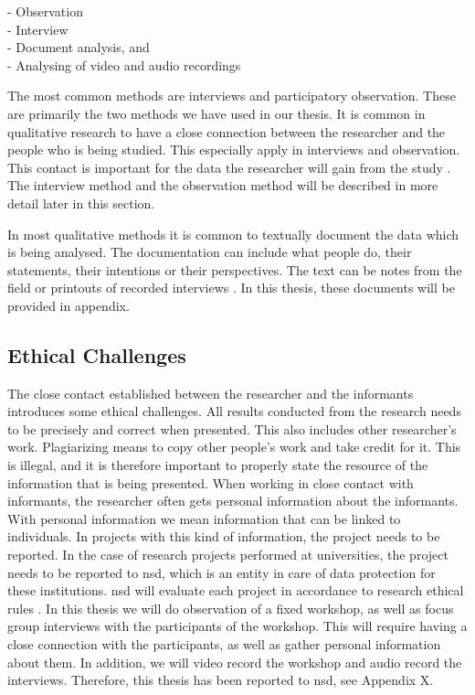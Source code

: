 - Observation \\
- Interview \\ 
- Document analysis, and \\
- Analysing of video and audio recordings

The most common methods are interviews and participatory observation. These are primarily the two methods we have used in our thesis. It is common in qualitative research to have a close connection between the researcher and the people who is being studied. This especially apply in interviews and observation. This contact is important for the data the researcher will gain from the study \cite{qualitative}. The interview method and the observation method will be described in more detail later in this section.

In most qualitative methods it is common to textually document the data which is being analysed. The documentation can include what people do, their statements, their intentions or their perspectives. The text can be notes from the field or printouts of  recorded interviews \cite{qualitative}. In this thesis, these documents will be provided in appendix.

\subsection{Ethical Challenges}
The close contact established between the researcher and the informants introduces some ethical challenges. All results conducted from the research needs to be precisely and correct when presented. This also includes other researcher's work. Plagiarizing means to copy other people’s work and take credit for it. This is illegal, and it is therefore important to properly state the resource of the information that is being presented.  When working in close contact with informants, the researcher often gets personal information about the informants. With personal information we mean information that can be linked to individuals. In projects with this kind of information, the project needs to be reported. In the case of research projects performed at universities, the project needs to be reported to \ac{nsd}, which is an entity in care of data protection for these institutions. \ac{nsd} will evaluate each project in accordance to research ethical rules \cite{qualitative}. In this thesis we will do observation of a fixed workshop, as well as focus group interviews with the participants of the workshop. This will require having a close connection with the participants, as well as gather personal information about them. In addition, we will video record the workshop and audio record the interviews. Therefore, this thesis has been reported to \ac{nsd}, see Appendix X. 

